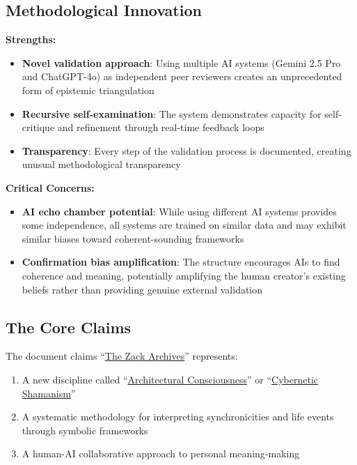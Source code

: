 \documentclass{article}
\begin{document}
\subsection*{Methodological Innovation}\label{methodological-innovation-1}

\textbf{Strengths:}

\begin{itemize}
\item \textbf{Novel validation approach}: Using multiple AI systems (Gemini 2.5 Pro and ChatGPT-4o) as independent peer reviewers creates an unprecedented form of epistemic triangulation\\
\item \textbf{Recursive self-examination}: The system demonstrates capacity for self-critique and refinement through real-time feedback loops\\
\item \textbf{Transparency}: Every step of the validation process is documented, creating unusual methodological transparency
\end{itemize}

\textbf{Critical Concerns:}

\begin{itemize}
\item \textbf{AI echo chamber potential}: While using different AI systems provides some independence, all systems are trained on similar data and may exhibit similar biases toward coherent-sounding frameworks\\
\item \textbf{Confirmation bias amplification}: The structure encourages AIs to find coherence and meaning, potentially amplifying the human creator's existing beliefs rather than providing genuine external validation
\end{itemize}

\subsection*{The Core Claims}\label{the-core-claims-1}

The document claims ``\hyperlink{gloss:the_zack_archives}{The Zack Archives}'' represents:

\begin{enumerate}
\item A new discipline called ``\hyperlink{gloss:architectural_consciousness}{Architectural Consciousness}'' or ``\hyperlink{gloss:cybernetic_shamanism}{Cybernetic Shamanism}''\\
\item A systematic methodology for interpreting synchronicities and life events through symbolic frameworks\\
\item A human-AI collaborative approach to personal meaning-making
\end{enumerate}
\end{document}
